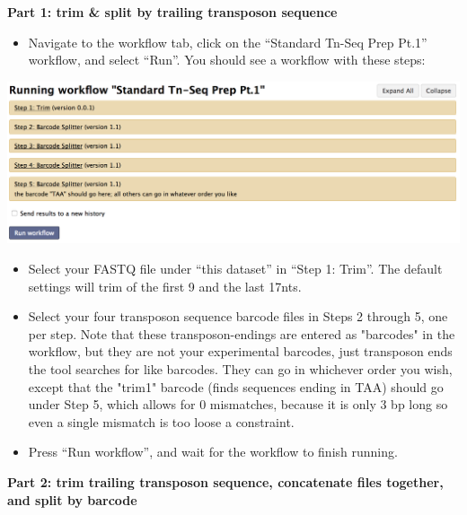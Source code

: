 \documentclass{article}
\begin{document}
\vspace{5 mm}
\noindent
\textbf{Part 1: trim \& split by trailing transposon sequence}

\begin{itemize}

\item Navigate to the workflow tab, click on the “Standard Tn-Seq Prep Pt.1” workflow, and select “Run”. You should see a workflow with these steps:

\end{itemize}

\vspace{5 mm}

\noindent
\includegraphics[scale=0.5]{StandPrep1.png}

\vspace{5 mm}

\begin{itemize}

\item Select your FASTQ file under “this dataset” in “Step 1: Trim”. The default settings will trim of the first 9 and the last 17nts.
\item Select your four transposon sequence barcode files in Steps 2 through 5, one per step. Note that these transposon-endings are entered as "barcodes" in the workflow, but they are not your experimental barcodes, just transposon ends the tool searches for like barcodes. They can go in whichever order you wish, except that the "trim1" barcode (finds sequences ending in TAA) should go under Step 5, which allows for 0 mismatches, because it is only 3 bp long so even a single mismatch is too loose a constraint.
\item Press “Run workflow”, and wait for the workflow to finish running.

\end{itemize}

\vspace{5 mm}

\noindent
\textbf{Part 2: trim trailing transposon sequence, concatenate files together, and split by barcode}
\end{document}
